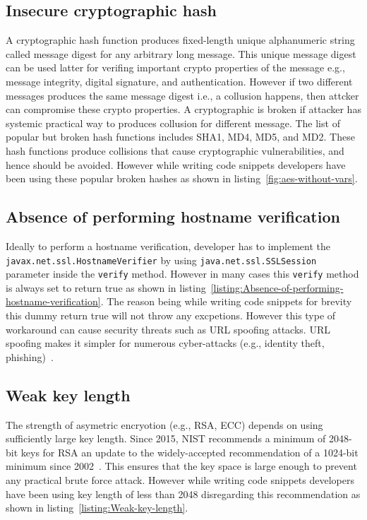 \subsection{Insecure cryptographic hash}
A cryptographic hash function produces fixed-length unique alphanumeric string called message digest for any arbitrary long message. This unique message digest can be used latter for verifing important crypto properties of the message e.g., message integrity, digital signature, and authentication. However if two different messages produces the same message digest i.e., a collusion happens, then attcker can compromise these crypto properties. A cryptographic is broken if attacker has systemic practical way to produces collusion for different message. The list of popular but broken hash functions includes SHA1, MD4, MD5, and MD2. These hash functions produce collisions that cause cryptographic vulnerabilities, and hence should be avoided. However while writing code snippets developers have been using these popular broken hashes as shown in listing~\ref{fig:aes-without-vars}. 


\subsection{Absence of performing hostname verification}


Ideally to perform a hostname verification, developer has to implement the \texttt{javax.net.ssl.HostnameVerifier} by using \texttt{java.net.\-ssl.SSLSession} parameter 
inside the \texttt{verify} method. However in many cases this \texttt{verify} method is always set to return true as shown in listing~\ref{listing:Absence-of-performing-hostname-verification}. 
The reason being while writing code snippets for brevity this dummy return true will not throw any excpetions.  
However this type of workaround can cause security threats such as URL spoofing attacks.  
URL spoofing makes it simpler for numerous cyber-attacks (e.g., identity theft, phishing)~\cite{url-spoofing}.

\subsection{Weak key length}
The strength of asymetric encryotion (e.g., RSA, ECC) depends on using sufficiently large key length. 
Since 2015, NIST recommends a minimum of 2048-bit keys for RSA an update to the widely-accepted recommendation of a 1024-bit minimum since 2002~\cite{barker2009recommendation}. This ensures that the key space is large enough to prevent any practical brute force attack.   
However while writing  code snippets developers have been using key length of less than 2048 disregarding this recommendation as shown in listing~\ref{listing:Weak-key-length}.

